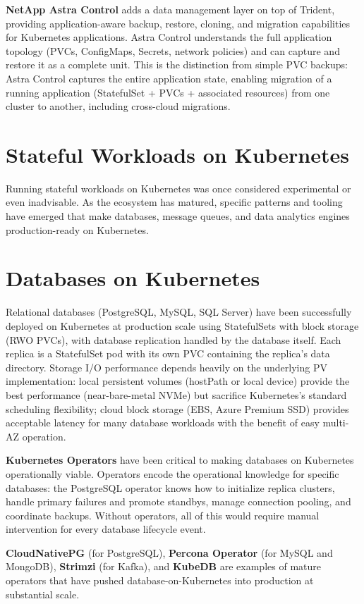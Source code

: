 \textbf{NetApp Astra Control} adds a data management layer on top of Trident, providing application-aware backup, restore, cloning, and migration capabilities for Kubernetes applications. Astra Control understands the full application topology (PVCs, ConfigMaps, Secrets, network policies) and can capture and restore it as a complete unit. This is the distinction from simple PVC backups: Astra Control captures the entire application state, enabling migration of a running application (StatefulSet + PVCs + associated resources) from one cluster to another, including cross-cloud migrations.

\section{Stateful Workloads on Kubernetes}
Running stateful workloads on Kubernetes was once considered experimental or even inadvisable. As the ecosystem has matured, specific patterns and tooling have emerged that make databases, message queues, and data analytics engines production-ready on Kubernetes.

\section{Databases on Kubernetes}
Relational databases (PostgreSQL, MySQL, SQL Server) have been successfully deployed on Kubernetes at production scale using StatefulSets with block storage (RWO PVCs), with database replication handled by the database itself. Each replica is a StatefulSet pod with its own PVC containing the replica's data directory. Storage I/O performance depends heavily on the underlying PV implementation: local persistent volumes (hostPath or local device) provide the best performance (near-bare-metal NVMe) but sacrifice Kubernetes's standard scheduling flexibility; cloud block storage (EBS, Azure Premium SSD) provides acceptable latency for many database workloads with the benefit of easy multi-AZ operation.

\textbf{Kubernetes Operators} have been critical to making databases on Kubernetes operationally viable. Operators encode the operational knowledge for specific databases: the PostgreSQL operator knows how to initialize replica clusters, handle primary failures and promote standbys, manage connection pooling, and coordinate backups. Without operators, all of this would require manual intervention for every database lifecycle event.

\textbf{CloudNativePG} (for PostgreSQL), \textbf{Percona Operator} (for MySQL and MongoDB), \textbf{Strimzi} (for Kafka), and \textbf{KubeDB} are examples of mature operators that have pushed database-on-Kubernetes into production at substantial scale.

